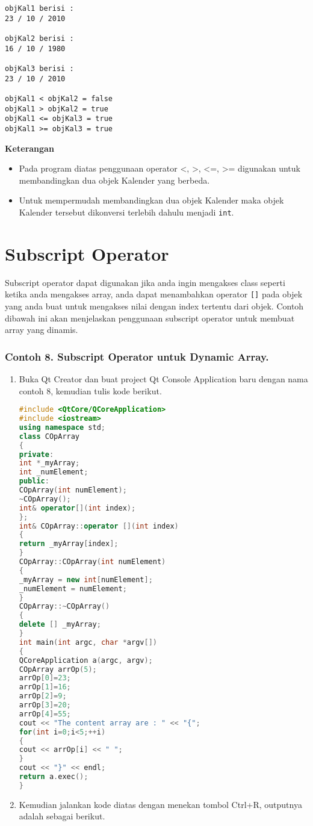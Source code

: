 \begin{verbatim}
objKal1 berisi :
23 / 10 / 2010

objKal2 berisi :
16 / 10 / 1980

objKal3 berisi :
23 / 10 / 2010

objKal1 < objKal2 = false
objKal1 > objKal2 = true
objKal1 <= objKal3 = true
objKal1 >= objKal3 = true
\end{verbatim}

\textbf{Keterangan}

\begin{itemize}
\tightlist
\item
  Pada program diatas penggunaan operator \textless{}, \textgreater{},
  \textless{}=, \textgreater{}= digunakan untuk membandingkan dua objek
  Kalender yang berbeda.
\item
  Untuk mempermudah membandingkan dua objek Kalender maka objek Kalender
  tersebut dikonversi terlebih dahulu menjadi \texttt{int}.
\end{itemize}

\section{Subscript Operator}\label{subscript-operator}

Subscript operator dapat digunakan jika anda ingin mengakses class
seperti ketika anda mengakses array, anda dapat menambahkan operator
\texttt{{[}{]}} pada objek yang anda buat untuk mengakses nilai dengan
index tertentu dari objek. Contoh dibawah ini akan menjelaskan
penggunaan subscript operator untuk membuat array yang dinamis.

\subsubsection*{Contoh 8. Subscript Operator untuk Dynamic Array.}

\begin{enumerate}
\def\labelenumi{\arabic{enumi}.}
\item
  Buka Qt Creator dan buat project Qt Console Application baru dengan
  nama contoh 8, kemudian tulis kode berikut.

\begin{lstlisting}[language=c++]
#include <QtCore/QCoreApplication>
#include <iostream>
using namespace std;
class COpArray
{
private:
int *_myArray;
int _numElement;
public:
COpArray(int numElement);
~COpArray();
int& operator[](int index);
};
int& COpArray::operator [](int index)
{
return _myArray[index];
}
COpArray::COpArray(int numElement)
{
_myArray = new int[numElement];
_numElement = numElement;
}
COpArray::~COpArray()
{
delete [] _myArray;
}
int main(int argc, char *argv[])
{
QCoreApplication a(argc, argv);
COpArray arrOp(5);
arrOp[0]=23;
arrOp[1]=16;
arrOp[2]=9;
arrOp[3]=20;
arrOp[4]=55;
cout << "The content array are : " << "{";
for(int i=0;i<5;++i)
{
cout << arrOp[i] << " ";
}
cout << "}" << endl;
return a.exec();
}
\end{lstlisting}
\item
  Kemudian jalankan kode diatas dengan menekan tombol Ctrl+R, outputnya
  adalah sebagai berikut.
\end{enumerate}

